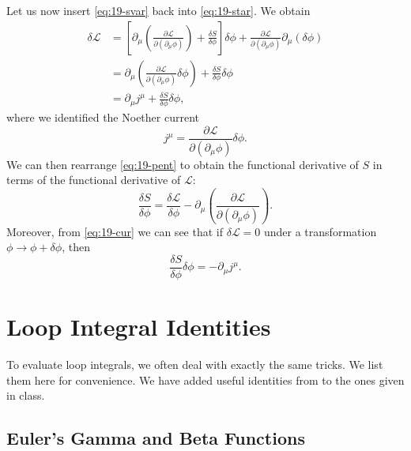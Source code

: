 \begin{appendices}
Let us now insert \eqref{eq:19-svar} back into \eqref{eq:19-star}.  We obtain
\begin{align}
  \delta \mathscr{L} &= \left[ \partial_{\mu} \left( \frac{\partial \mathscr{L}}{\partial (\partial_{\mu} \phi)} \right) + \frac{\delta S}{\delta \phi} \right] \delta\phi 
  + \frac{\partial \mathscr{L}}{\partial (\partial_{\mu} \phi)} \partial_{\mu} (\delta\phi) \\
			 &= \partial_{\mu} \left( \frac{\partial \mathscr{L}}{\partial (\partial_{\mu} \phi)} \delta\phi \right) + \frac{\delta S}{\delta \phi} \delta\phi \label{eq:19-pent} \\
			 &= \partial_{\mu} j^{\mu} + \frac{\delta S}{\delta \phi} \delta \phi, 
			 \label{eq:19-cur}
\end{align}
where we identified the Noether current
\begin{equation}
  j^{\mu} = \frac{\partial \mathscr{L}}{\partial (\partial_{\mu} \phi)} \delta \phi.
\end{equation}
We can then rearrange \eqref{eq:19-pent} to obtain the functional derivative of $S$ in terms of the functional derivative of $\mathscr{L}$:
\begin{equation}
  \frac{\delta S}{\delta \phi} = \frac{\delta \mathscr{L}}{\delta \phi} - \partial_{\mu} \left( \frac{\partial \mathscr{L}}{\partial (\partial_{\mu} \phi)} \right).
\end{equation}
Moreover, from \eqref{eq:19-cur} we can see that if $\delta \mathscr{L} = 0$ under a transformation $\phi \to \phi + \delta \phi$, then
\begin{equation}
  \label{eq:apx-cur}
  \frac{\delta S}{\delta \phi} \delta \phi = -\partial_{\mu} j^{\mu}.
\end{equation}

\chapter{Loop Integral Identities}%
\label{apx:loop_integral_identities}

To evaluate loop integrals, we often deal with exactly the same tricks. We list them here for convenience. We have added useful identities from \cite[Apx.~B]{schwartz} to the ones given in class.

\section{Euler's Gamma and Beta Functions}%
\label{sec:gamma_function}


\end{appendices}
